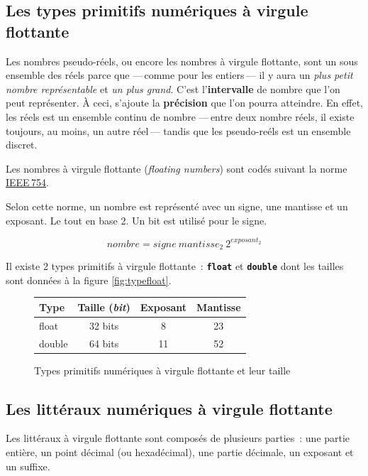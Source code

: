 \subsection{Les types primitifs numériques à virgule flottante}

Les nombres pseudo-réels, ou encore les nombres à virgule flottante, sont un
sous ensemble des réels parce que —\,comme pour les entiers\,— il y aura un
\textit{plus petit nombre représentable} et \textit{un plus grand}. C'est
l'\textbf{intervalle} de nombre que l'on peut représenter. À ceci, s'ajoute la
\textbf{précision} que l'on pourra atteindre. En effet, les réels est un
ensemble continu de nombre —\,entre deux nombre réels, il existe toujours, au
moins, un autre réel\,— tandis que les pseudo-reéls est un ensemble discret. 

Les nombres à virgule flottante (\textit{floating numbers}) sont codés suivant
la norme \href{https://fr.wikipedia.org/wiki/IEEE_754}{IEEE\,754}. 

Selon cette norme, un nombre est représenté avec un signe, une mantisse et un
exposant. Le tout en base 2. Un bit est utilisé pour le signe.  

\[
	nombre = signe~mantisse_2~2^{exposant_2} 
\]

Il existe 2 types primitifs à virgule flottante~: \textbf{\texttt{float}} et
\textbf{\texttt{double}} dont les tailles sont données à la figure
\vref{fig:typefloat}.

\begin{figure}[h]
	\centering
	\begin{tabular}[t]{|l|c|c|c|}
		\hline
		\rowcolor{black!40}
		\textbf{Type} 	& \textbf{Taille (\textit{bit})}	
								& \textbf{Exposant} & \textbf{Mantisse}\\
		\hline
		float	& 32 bits					& 8		& 23\\
		\hline
		double	& 64 bits					& 11	& 52\\
		\hline
	\end{tabular}
	\caption{Types primitifs numériques à virgule flottante et leur taille}
	\label{fig:typefloat}
\end{figure}



\subsection{Les littéraux numériques à virgule flottante}

Les littéraux à virgule flottante sont composés de plusieurs parties~: une
partie entière, un point décimal (ou hexadécimal), une partie décimale, un
exposant et un suffixe.

